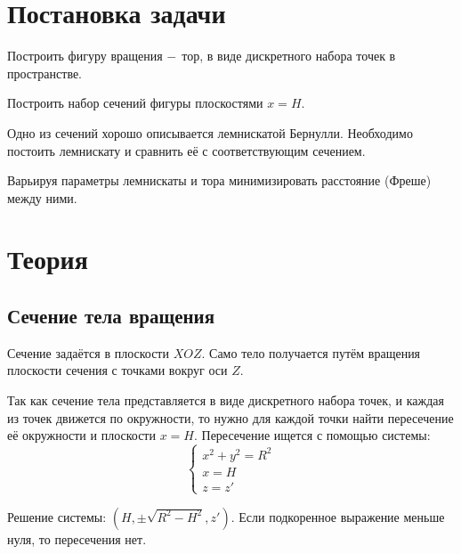 \documentclass[a4]{article}
\renewcommand{\listoffigures}{\begingroup %
\tocsection
\tocfile{\listfigurename}{lof}
\endgroup}
\begin{document}
\newpage
\pagestyle{plain}



\newpage
\tableofcontents{}
\newpage
\listoffigures{}
\newpage

\section{Постановка задачи}
Построить фигуру вращения $\--$ тор, в виде дискретного набора точек в пространстве. \hfill\cite{source}

Построить набор сечений фигуры плоскостями $x = H.$

Одно из сечений хорошо описывается лемнискатой Бернулли. Необходимо постоить лемнискату и сравнить её с соответствующим сечением.

Варьируя параметры лемнискаты и тора минимизировать расстояние (Фреше) между ними.

\section{Теория}
\subsection{Сечение тела вращения}
Сечение задаётся в плоскости $XOZ.$ Само тело получается путём вращения плоскости сечения с точками вокруг оси $Z.$ \hfill\cite{source}

Так как сечение тела представляется в виде дискретного набора точек, и каждая из точек движется по окружности, то нужно для каждой точки найти пересечение её окружности и плоскости $x = H.$ Пересечение ищется с помощью системы:
\begin{equation}
    \begin{cases}
    x^2+y^2=R^2\\
    x=H\\
    z=z'
    \end{cases}
\end{equation}

Решение системы: $(H,\pm \sqrt{R^2-H^2},z').$ Если подкоренное выражение меньше нуля, то пересечения нет.
\end{document}
